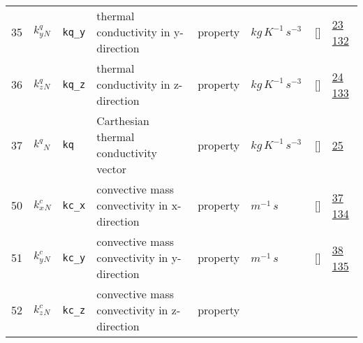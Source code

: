 \begin{longtable}{|p{1cm}|p{3cm}|p{3cm}|p{7cm}|p{3.0cm}|p{3cm}|p{2cm}|p{1cm}|}
                 \\
    35
             & \hypertarget{"v:35"}{ $ {k^q_y}{_{N}} $}
             & \verb|kq_y|
             & thermal conductivity in y-direction
             & \begin{lay}property \end{lay}
             & $ kg \,K^{-1} \,s^{-3} \, $
             & []
             & \hyperlink{"e:23"}{ 23 }
                 \hyperlink{"e:132"}{ 132 }
                 \\
    36
             & \hypertarget{"v:36"}{ $ {k^q_z}{_{N}} $}
             & \verb|kq_z|
             & thermal conductivity in z-direction
             & \begin{lay}property \end{lay}
             & $ kg \,K^{-1} \,s^{-3} \, $
             & []
             & \hyperlink{"e:24"}{ 24 }
                 \hyperlink{"e:133"}{ 133 }
                 \\
    37
             & \hypertarget{"v:37"}{ $ {k^q}{_{N}} $}
             & \verb|kq|
             & Carthesian thermal conductivity vector
             & \begin{lay}property \end{lay}
             & $ kg \,K^{-1} \,s^{-3} \, $
             & []
             & \hyperlink{"e:25"}{ 25 }
                 \\
    50
             & \hypertarget{"v:50"}{ $ {k^c_x}{_{N}} $}
             & \verb|kc_x|
             & convective mass convectivity in x-direction
             & \begin{lay}property \end{lay}
             & $ m^{-1} \,s \, $
             & []
             & \hyperlink{"e:37"}{ 37 }
                 \hyperlink{"e:134"}{ 134 }
                 \\
    51
             & \hypertarget{"v:51"}{ $ {k^c_y}{_{N}} $}
             & \verb|kc_y|
             & convective mass convectivity in y-direction
             & \begin{lay}property \end{lay}
             & $ m^{-1} \,s \, $
             & []
             & \hyperlink{"e:38"}{ 38 }
                 \hyperlink{"e:135"}{ 135 }
                 \\
    52
             & \hypertarget{"v:52"}{ $ {k^c_z}{_{N}} $}
             & \verb|kc_z|
             & convective mass convectivity in z-direction
             & \begin{lay}property \end{lay}

\end{longtable}
